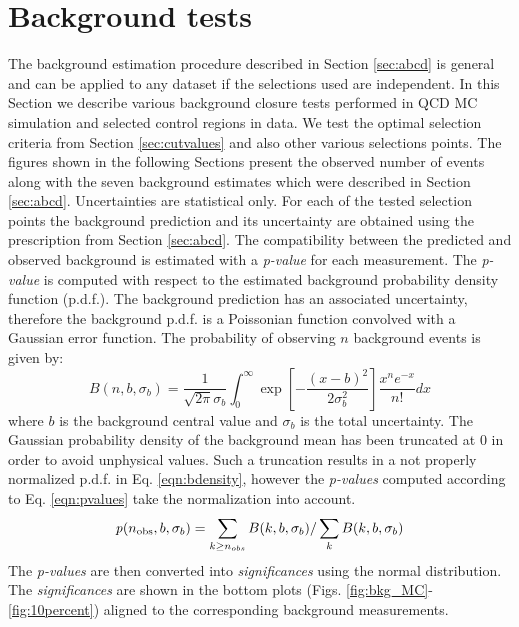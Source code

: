 \section{Background tests}
\label{sec:backgroundtests}
The background estimation procedure described in Section \ref{sec:abcd} is general and can be applied
to any dataset if the selections used are independent.
In this Section we describe various background closure tests
 performed in QCD MC simulation and 
selected control regions in data.
We test the optimal selection criteria from Section \ref{sec:cutvalues} and also other various selections points.
The figures shown in the following Sections present the observed number
of events along with the seven background estimates which were described
 in Section \ref{sec:abcd}.
Uncertainties are statistical only. 
For each of the tested selection points the background prediction 
and its uncertainty are obtained 
using the prescription from Section \ref{sec:abcd}. 
The compatibility between the predicted and observed background is estimated with a {\it p-value} for each measurement. 
 The {\it p-value}
is computed with respect to the estimated background probability density function (p.d.f.). 
The background prediction has an associated uncertainty, 
therefore the background p.d.f. is a Poissonian function convolved  
with a Gaussian error function. The probability of observing $n$ background events is given by:
\begin{equation}
B(n,b,\sigma_b)= \frac{1}{\sqrt{2\pi}\sigma_b} \int_{0}^{\infty} 
\exp\left[ -\frac{\left(x-b\right)^2}{2\sigma_b^2}\right]\frac{x^n e^{-x}}{n!}dx
\label{eqn:bdensity}
\end{equation}
where $b$ is the background central value and $\sigma_b$ is the total uncertainty.
The Gaussian probability density of the background mean has been truncated at 
0 in order to avoid unphysical values. Such a truncation results in a not properly normalized p.d.f. in Eq. 
\ref{eqn:bdensity}, however the {\it p-values} computed according to Eq. \ref{eqn:pvalues} take the 
normalization into account.   
\begin{equation}
{\it p} (n_\text{obs},b,\sigma_b) = \sum_{k\geq n_{obs}} B(k,b,\sigma_b) / \sum_{k} B(k,b,\sigma_b)
\label{eqn:pvalues}
\end{equation}
The {\it p-values} are then converted into {\it significances} using the normal
 distribution. The {\it significances} are shown in the bottom plots (Figs. 
\ref{fig:bkg_MC}-\ref{fig:10percent}) aligned to the corresponding background
measurements.  


